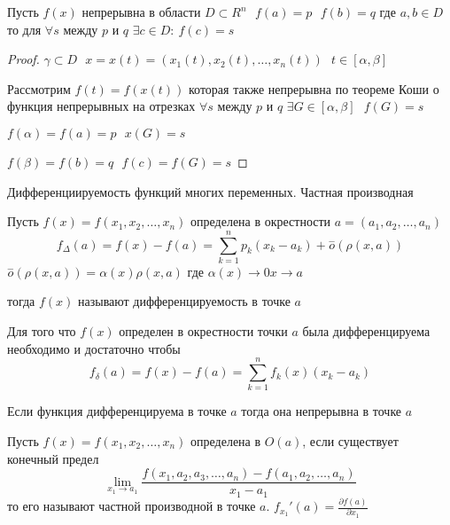 \begin{theorem}
  Пусть $f(x)$ непрерывна в области $D \subset R^n ~~~ f(a) = p ~~~ f(b) = q$
  где $a,b \in D$ то для $\forall s$ между $p$ и $q$
  $\exists c \in D: ~ f(c) = s$
\end{theorem}

\begin{proof}
  $\gamma \subset D ~~~ x = x(t) = (x_1(t), x_2(t), \ldots, x_n(t)) ~~~
  t \in [\alpha, \beta]$

  Рассмотрим $f(t) = f(x(t))$ которая также непрерывна по теореме Коши о
  функция непрерывных на отрезках $\forall s$ между $p$ и $q$
  $\exists G \in [\alpha, \beta] ~~~ f(G) = s$

  $f(\alpha) = f(a) = p ~~~ x(G) = s$

  $f(\beta) = f(b) = q ~~~ f(c) = f(G) = s$
\end{proof}

\begin{title}[\Large]
  Дифференциируемость функций многих переменных. Частная производная
\end{title}

\begin{define}
  Пусть $f(x) = f(x_1, x_2, \ldots, x_n)$ определена в окрестности
  $a = (a_1, a_2, \ldots, a_n)$
  $$
  f_{\Delta}(a) = f(x) - f(a) = \sum_{k=1}^n p_k (x_k - a_k) +
  \stackrel{-}{o}(\rho(x, a))
  $$
  $\stackrel{-}{o}(\rho(x, a)) = \alpha(x) \rho(x, a)$ где $\alpha(x) \to 0
  x \to a$

  тогда $f(x)$ называют дифференцируемость в точке $a$
\end{define}

\begin{block}[Критерий]
  Для того что $f(x)$ определен в окрестности точки $a$ была дифференцируема
  необходимо и достаточно чтобы
  $$
  f_{\delta}(a) = f(x) - f(a) = \sum_{k=1}^n f_k(x)(x_k - a_k)
  $$
\end{block}

\begin{theorem}
  Если функция дифференцируема в точке $a$ тогда она непрерывна в точке $a$
\end{theorem}

\begin{define}
  Пусть $f(x) = f(x_1, x_2, \ldots, x_n)$ определена в $O(a)$, если существует
  конечный предел
  $$
  \lim_{x_1 \to a_1}
  \frac{f(x_1, a_2, a_3, \ldots, a_n) - f(a_1, a_2, \ldots, a_n)}{x_1 - a_1}
  $$
  то его называют частной производной в точке $a$. $f_{x_1}'(a) =
  \frac{\partial f(a)}{\partial x_1}$
\end{define}

